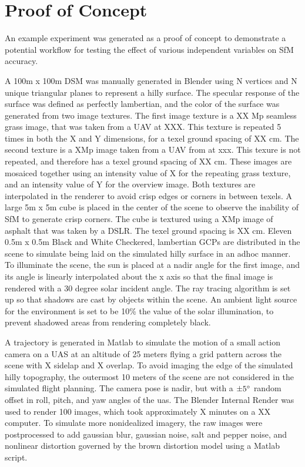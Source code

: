 \section{Proof of Concept}

An example experiment was generated as a proof of concept to demonstrate a potential workflow for testing the effect of various independent variables on SfM accuracy.  

A 100m x 100m DSM was manually generated in Blender using N vertices and N unique triangular planes to represent a hilly surface.  The specular response of the surface was defined as perfectly lambertian, and the color of the surface was generated from two image textures.  The first image texture is a XX Mp seamless grass image, that was taken from a UAV at XXX.  This texture is repeated 5 times in both the X and Y dimensions, for a texel ground spacing of XX cm.  The second texture is a XMp image taken from a UAV from at xxx.  This texure is not repeated, and therefore has a texel ground spacing of XX cm.  These images are mosaiced together using an intensity value of X for the repeating grass texture, and an intensity value of Y for the overview image.  Both textures are interpolated in the renderer to avoid crisp edges or corners in between texels.  A large 5m x 5m cube is placed in the center of the scene to observe the inability of SfM to generate crisp corners.  The cube is textured using a XMp image of asphalt that was taken by a DSLR.  The texel ground spacing is XX cm.  Eleven 0.5m x 0.5m Black and White Checkered, lambertian GCPs are distributed in the scene to simulate being laid on the simulated hilly surface in an adhoc manner.  To illuminate the scene, the sun is placed at a nadir angle for the first image, and its angle is linearly interpolated about the x axis so that the final image is rendered with a 30 degree solar incident angle.  The ray tracing algorithm is set up so that shadows are cast by objects within the scene.  An ambient light source for the environment is set to be 10\% the value of the solar illumination, to prevent shadowed areas from rendering completely black.  

A trajectory is generated in Matlab to simulate the motion of a small action camera on a UAS at an altitude of 25 meters flying a grid pattern across the scene with X sidelap and X overlap.  To avoid imaging the edge of the simulated hilly topography, the outermost 10 meters of the scene are not considered in the simulated flight planning.  The camera pose is nadir, but with a $\pm 5 \degree$ random offset in roll, pitch, and yaw angles of the uas.  The Blender Internal Render was used to render 100 images, which took approximately X minutes on a XX computer.  To simulate more nonidealized imagery, the raw images were postprocessed to add gaussian blur, gaussian noise, salt and pepper noise, and nonlinear distortion governed by the brown distortion model using a Matlab script.

